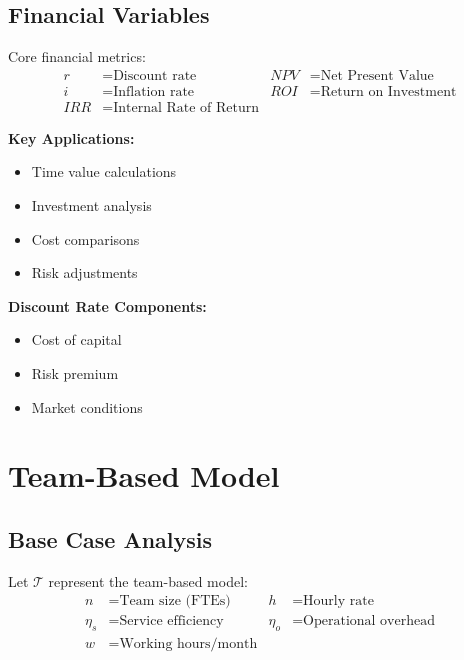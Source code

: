 \documentclass[12pt,a4paper]{article}
\newenvironment{definition}[1]
{\begin{mdframed}[style=definitionstyle,frametitle={Definition: #1}]}
{\end{mdframed}}
\newenvironment{explanation}
{\begin{mdframed}[style=explanationstyle,frametitle={Explanation}]}
{\end{mdframed}}
\begin{document}
\subsection{Financial Variables}
\begin{definition}{Financial Parameters}
Core financial metrics:
\begin{align*}
    r &= \text{Discount rate} & NPV &= \text{Net Present Value} \\
    i &= \text{Inflation rate} & ROI &= \text{Return on Investment} \\
    IRR &= \text{Internal Rate of Return} & &
\end{align*}
\end{definition}

\begin{explanation}
\textbf{Key Applications:}
\begin{itemize}
    \item Time value calculations
    \item Investment analysis
    \item Cost comparisons
    \item Risk adjustments
\end{itemize}
\textbf{Discount Rate Components:}
\begin{itemize}
    \item Cost of capital
    \item Risk premium
    \item Market conditions
\end{itemize}
\end{explanation}

\section{Team-Based Model}
\subsection{Base Case Analysis}
\begin{definition}{Team Model Variables}
Let $\mathcal{T}$ represent the team-based model:
\begin{align*}
    n &= \text{Team size (FTEs)} & h &= \text{Hourly rate} \\
    \eta_s &= \text{Service efficiency} & \eta_o &= \text{Operational overhead} \\
    w &= \text{Working hours/month} & &
\end{align*}
\end{definition}
\end{document}
